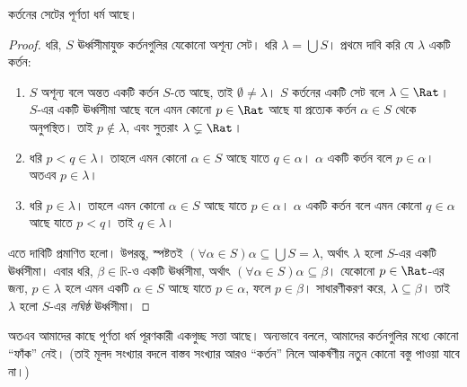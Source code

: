\documentclass[../../../include/open-logic-section]{subfiles}
\begin{document}
\begin{thm}
কর্তনের সেটের পূর্ণতা ধর্ম আছে।
\end{thm}

\begin{proof}
ধরি, $S$ ঊর্ধ্বসীমাযুক্ত কর্তনগুলির যেকোনো অশূন্য সেট। ধরি $\lambda
= \bigcup S$।
প্রথমে দাবি করি যে $\lambda$ একটি কর্তন:
\begin{enumerate}
\item $S$ অশূন্য বলে অন্তত একটি কর্তন $S$-তে আছে, তাই
$\emptyset \neq \lambda$। 
$S$ কর্তনের একটি সেট বলে $\lambda
\subseteq \Rat$। $S$-এর একটি ঊর্ধ্বসীমা আছে বলে এমন কোনো $p \in \Rat$ আছে যা প্রত্যেক কর্তন $\alpha \in S$ থেকে অনুপস্থিত। তাই $p\notin \lambda$, এবং সুতরাং
$\lambda \subsetneq \Rat$।
\item ধরি $p < q \in \lambda$। তাহলে এমন কোনো $\alpha \in S$ আছে যাতে $q \in \alpha$। $\alpha$ একটি কর্তন বলে $p \in \alpha$। অতএব
$p \in \lambda$।
\item ধরি $p \in \lambda$। তাহলে এমন কোনো $\alpha \in S$ আছে যাতে $p \in \alpha$। $\alpha$ একটি কর্তন বলে এমন কোনো $q \in
\alpha$ আছে যাতে $p < q$। তাই $q \in \lambda$।
\end{enumerate}
এতে দাবিটি প্রমাণিত হলো। উপরন্তু, স্পষ্টতই $(\forall \alpha \in S)\alpha
\subseteq \bigcup S = \lambda$, অর্থাৎ $\lambda$ হলো $S$-এর একটি ঊর্ধ্বসীমা। এবার ধরি, $\beta \in \mathbb{R}$-ও একটি ঊর্ধ্বসীমা, অর্থাৎ $(\forall \alpha \in S)\alpha \subseteq \beta$। যেকোনো $p \in \Rat$-এর জন্য, $p \in \lambda$ হলে এমন একটি $\alpha \in S$ আছে যাতে $p \in \alpha$, ফলে $p \in \beta$। সাধারণীকরণ করে, $\lambda \subseteq \beta$। তাই $\lambda$ হলো $S$-এর \emph{লঘিষ্ঠ} ঊর্ধ্বসীমা।
\end{proof}

অতএব আমাদের কাছে পূর্ণতা ধর্ম পূরণকারী একগুচ্ছ সত্তা আছে। অন্যভাবে বললে, আমাদের কর্তনগুলির মধ্যে কোনো ``ফাঁক'' নেই। (তাই মূলদ সংখ্যার বদলে বাস্তব সংখ্যার আরও ``কর্তন'' নিলে আকর্ষণীয় নতুন কোনো বস্তু পাওয়া যাবে না।)
\end{document}
